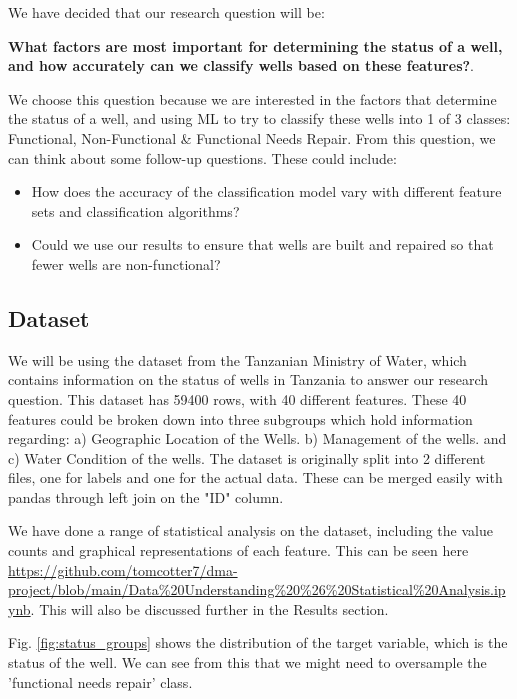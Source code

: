 \documentclass[conference]{IEEEtran}
\begin{document}
We have decided that our research question will be: 

\textbf{What factors are most important for determining the status of a well, and how accurately can we classify wells based on these features?}. 

We choose this question because we are interested in the factors that determine the status of a well, and using ML to try to classify these wells into 1 of 3 classes: Functional, Non-Functional \& Functional Needs Repair. From this question, we can think about some follow-up questions. These could include:
    \begin{itemize}
        \item How does the accuracy of the classification model vary with different feature sets and classification algorithms?
        \item Could we use our results to ensure that wells are built and repaired so that fewer wells are non-functional?
    \end{itemize}

\subsection{Dataset}

We will be using the dataset from the Tanzanian Ministry of Water, which contains information on the status of wells in Tanzania to answer our research question. This dataset has 59400 rows, with 40 different features. These 40 features could be broken down into three subgroups which hold information regarding: a) Geographic Location of the Wells. b) Management of the wells. and c) Water Condition of the wells. The dataset is originally split into 2 different files, one for labels and one for the actual data. These can be merged easily with pandas through left join on the "ID" column. 


We have done a range of statistical analysis on the dataset, including the value counts and graphical representations of each feature. This can be seen here \url{https://github.com/tomcotter7/dma-project/blob/main/Data%20Understanding%20%26%20Statistical%20Analysis.ipynb}. This will also be discussed further in the Results section.

Fig. \ref{fig:status_groups} shows the distribution of the target variable, which is the status of the well. We can see from this that we might need to oversample the 'functional needs repair' class.
\end{document}
